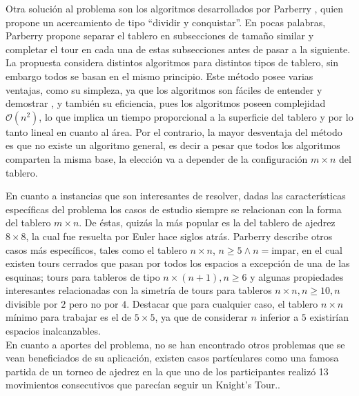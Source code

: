 \documentclass[journal, 10pt]{IEEEtran}
\begin{document}
Otra solución al problema son los algoritmos desarrollados por Parberry \cite{Parberry:1997}, quien propone un acercamiento de tipo “dividir y conquistar”. En pocas palabras, Parberry propone separar el tablero en subsecciones de tamaño similar y completar el tour en cada una de estas subsecciones antes de pasar a la siguiente. La propuesta considera distintos algoritmos para distintos tipos de tablero, sin embargo todos se basan en el mismo principio. Este método posee varias ventajas, como su simpleza, ya que los algoritmos son fáciles de entender y demostrar \cite{Parberry:1997}, y también su eficiencia, pues los algoritmos poseen complejidad $\mathcal{O}(n^2)$, lo que implica un tiempo proporcional a la superficie del tablero y por lo tanto lineal en cuanto al área. Por el contrario, la mayor desventaja del método es que no existe un algoritmo general, es decir a pesar que todos los algoritmos comparten la misma base, la elección va a depender de la configuración $m\times n$ del tablero.

En cuanto a instancias que son interesantes de resolver, dadas las características específicas del problema los casos de estudio siempre se relacionan con la forma del tablero $m \times n$. De éstas, quizás la más popular es la del tablero de ajedrez $8 \times 8$, la cual fue resuelta por Euler \cite{Euler:1759} hace siglos atrás. Parberry \cite{Parberry:1997} describe otros casos más específicos, tales como el tablero $n \times n$, $n \ge 5 \wedge n=\text{impar}$, en el cual existen tours cerrados que pasan por todos los espacios a excepción de una de las esquinas; tours para tableros de tipo $n \times (n+1), n \ge 6$ y algunas propiedades interesantes relacionadas con la simetría de tours para tableros $n \times n, n \ge 10, n$ divisible por $2$ pero no por $4$. Destacar que para cualquier caso, el tablero $n \times n$ mínimo para trabajar es el de $5\times 5$, ya que de considerar $n$ inferior a $5$ existirían espacios inalcanzables.\\
En cuanto a aportes del problema, no se han encontrado otros problemas que se vean beneficiados de su aplicación, existen casos partículares como una famosa partida de un torneo de ajedrez en la que uno de los participantes realizó 13 movimientos consecutivos que parecían seguir un Knight's Tour.\cite{Shabazz:2010}.

 
\end{document}
